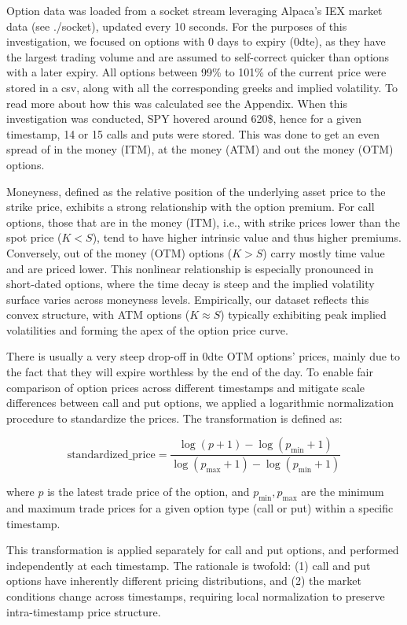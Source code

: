 \documentclass{article}
\begin{document}
Option data was loaded from a socket stream leveraging Alpaca's IEX market data (see ./socket), updated every 10 seconds. For the purposes of this investigation, we focused on options with 0 days to expiry (0dte), as they have the largest trading volume and are assumed to self-correct quicker than options with a later expiry. All options between 99\% to 101\% of the current price were stored in a csv, along with all the corresponding greeks and implied volatility. To read more about how this was calculated see the Appendix. When this investigation was conducted, SPY hovered around 620\$, hence for a given timestamp, 14 or 15 calls and puts were stored. This was done to get an even spread of in the money (ITM), at the money (ATM) and out the money (OTM) options.

Moneyness, defined as the relative position of the underlying asset price to the strike price, exhibits a strong relationship with the option premium. For call options, those that are in the money (ITM), i.e., with strike prices lower than the spot price (\(K < S\)), tend to have higher intrinsic value and thus higher premiums. Conversely, out of the money (OTM) options (\(K > S\)) carry mostly time value and are priced lower. This nonlinear relationship is especially pronounced in short-dated options, where the time decay is steep and the implied volatility surface varies across moneyness levels. Empirically, our dataset reflects this convex structure, with ATM options (\(K \approx S\)) typically exhibiting peak implied volatilities and forming the apex of the option price curve.

There is usually a very steep drop-off in 0dte OTM options' prices, mainly due to the fact that they will expire worthless by the end of the day. To enable fair comparison of option prices across different timestamps and mitigate scale differences between call and put options, we applied a logarithmic normalization procedure to standardize the prices. The transformation is defined as:

\[
\text{standardized\_price} = \frac{\log(p + 1) - \log(p_{\min} + 1)}{\log(p_{\max} + 1) - \log(p_{\min} + 1)}
\]

where \(p\) is the latest trade price of the option, and \(p_{\min}, p_{\max}\) are the minimum and maximum trade prices for a given option type (call or put) within a specific timestamp.

This transformation is applied separately for call and put options, and performed independently at each timestamp. The rationale is twofold: (1) call and put options have inherently different pricing distributions, and (2) the market conditions change across timestamps, requiring local normalization to preserve intra-timestamp price structure. 
\end{document}
